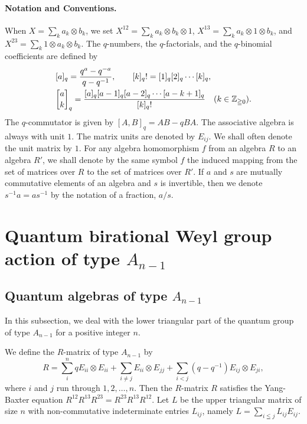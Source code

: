 \documentclass[12pt,twoside]{article}
\newcommand\ot{\otimes}
\newcommand\Z{{\mathbb Z}} %
\theoremstyle{plain} %
\theoremstyle{definition} %
\theoremstyle{definition} %
\numberwithin{theorem}{section}
\numberwithin{equation}{section}
\numberwithin{figure}{section}
\numberwithin{table}{section}
\begin{document}
\paragraph{Notation and Conventions.}
When $X = \sum_k a_k\ot b_k$, we set 
$X^{12}=\sum_k a_k\ot b_k\ot 1$, 
$X^{13}=\sum_k a_k\ot 1\ot b_k$, and
$X^{23}=\sum_k 1\ot a_k\ot b_k$.
The $q$-numbers, the $q$-factorials, and the $q$-binomial coefficients are defined by
\begin{align*}
 &
 [a]_q = \frac{q^a-q^{-a}}{q-q^{-1}}, \qquad
 [k]_q! = [1]_q[2]_q\cdots[k]_q, \quad
 \\ &
 \qbinom{a}{k}_q =
 \frac{[a]_q[a-1]_q[a-2]_q\cdots[a-k+1]_q}{[k]_q!}
 \quad  (k\in\Z_{\geqq0}).
\end{align*}
The $q$-commutator is given by $[A,B]_q=AB-qBA$.
The associative algebra is always with unit $1$. 
The matrix units are denoted by $E_{ij}$.
We shall often denote the unit matrix by $1$.
For any algebra homomorphism $f$ from an algebra $R$ to an algebra $R'$,
we shall denote by the same symbol $f$
the induced mapping from the set of matrices over $R$
to the set of matrices over $R'$.
If $a$ and $s$ are mutually commutative elements of an algebra 
and $s$ is invertible, then we denote $s^{-1}a=as^{-1}$ 
by the notation of a fraction, $a/s$.


\section{Quantum birational Weyl group action of type $A_{n-1}$}
\label{sec:A_{n-1}}


\subsection{Quantum algebras of type $A_{n-1}$}
\label{sec:quantum-alg-A_{n-1}}

In this subsection, we deal with the lower triangular part of 
the quantum group of type $A_{n-1}$ for a positive integer $n$.

We define the $R$-matrix of type $A_{n-1}$ by
\begin{equation}
 R 
 = \sum_i^n q E_{ii}\ot E_{ii}
 + \sum_{i\ne j} E_{ii}\ot E_{jj}
 + \sum_{i<j} (q-q^{-1}) E_{ij}\ot E_{ji},
 \label{eq:def-R}
\end{equation}
where $i$ and $j$ run through $1,2,\ldots,n$.
Then the $R$-matrix $R$ satisfies the Yang-Baxter equation
$R^{12}R^{13}R^{23} = R^{23}R^{13}R^{12}$.
Let $L$ be the upper triangular matrix of size $n$ with 
non-commutative indeterminate entries $L_{ij}$,
namely $L = \sum_{i\leqq j} L_{ij} E_{ij}$.
\end{document}
